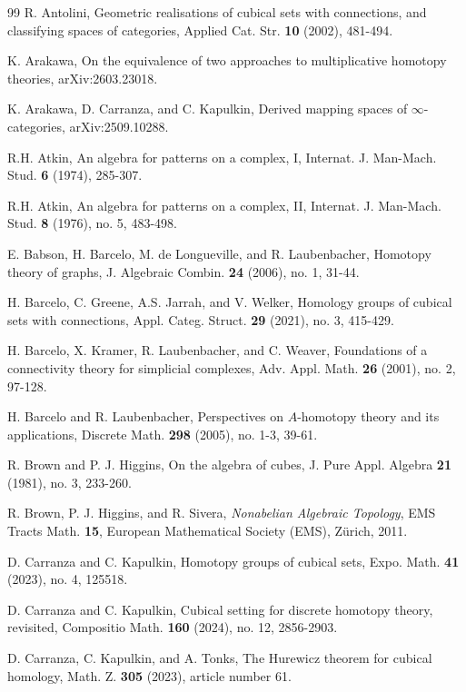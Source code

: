 \documentclass[oneside, 12pt]{amsart}
\numberwithin{equation}{section}
\theoremstyle{plain}
\theoremstyle{definition}
\theoremstyle{remark}
\begin{document}
	
	\begin{thebibliography}{99}
		 R. Antolini, Geometric realisations of cubical sets with connections, and classifying spaces of categories, Applied Cat. Str. \textbf{10} (2002), 481-494.
		
		 K. Arakawa, On the equivalence of two approaches to multiplicative homotopy theories, arXiv:2603.23018.
		
		 K. Arakawa, D. Carranza, and C. Kapulkin, Derived mapping spaces of $\infty$-categories, arXiv:2509.10288.
		
		 R.H. Atkin, An algebra for patterns on a complex, I, Internat. J. Man-Mach. Stud. \textbf{6} (1974), 285-307.
		
		 R.H. Atkin, An algebra for patterns on a complex, II, Internat. J. Man-Mach. Stud. \textbf{8} (1976), no. 5, 483-498.
		
		 E. Babson, H. Barcelo, M. de Longueville, and R. Laubenbacher, Homotopy theory of graphs, J. Algebraic Combin. \textbf{24} (2006), no. 1, 31-44.
		
		 H. Barcelo, C. Greene, A.S. Jarrah, and V. Welker, Homology groups of cubical sets with connections, Appl. Categ. Struct. \textbf{29} (2021), no. 3, 415-429.
		
		  H. Barcelo, X. Kramer, R. Laubenbacher, and C. Weaver, Foundations of a connectivity theory for simplicial complexes, Adv. Appl. Math. \textbf{26} (2001), no. 2, 97-128.
		
		 H. Barcelo and R. Laubenbacher, Perspectives on $A$-homotopy theory and its applications, Discrete Math. \textbf{298} (2005), no. 1-3, 39-61.
		
		 R. Brown and P. J. Higgins, On the algebra of cubes, J. Pure Appl. Algebra \textbf{21} (1981), no. 3, 233-260.
		
		 R. Brown, P. J. Higgins, and R. Sivera, \emph{Nonabelian Algebraic Topology}, EMS Tracts Math. \textbf{15}, European Mathematical Society (EMS), Zürich, 2011.
		
		 D. Carranza and C. Kapulkin, Homotopy groups of cubical sets, Expo. Math. \textbf{41} (2023), no. 4, 125518.
		
		 D. Carranza and C. Kapulkin, Cubical setting for discrete homotopy theory, revisited, Compositio Math. \textbf{160} (2024), no. 12, 2856-2903.
		
		 D. Carranza, C. Kapulkin, and A. Tonks, The Hurewicz theorem for cubical homology, Math. Z. \textbf{305} (2023), article number 61.
		

\end{thebibliography}
\end{document}
